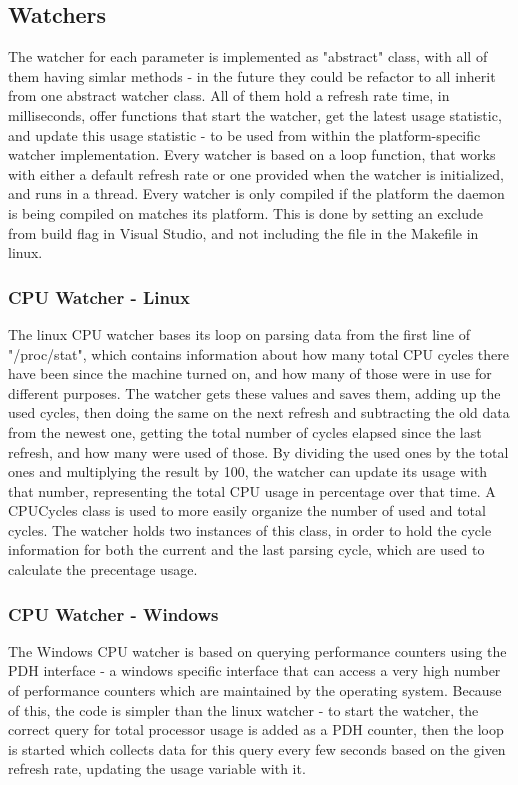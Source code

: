 \documentclass{l3proj}
\begin{document}
\subsection{Watchers}

The watcher for each parameter is implemented as "abstract" class, with all of them having simlar methods - in the future they could be refactor to all inherit from one abstract watcher class. All of them hold a refresh rate time, in milliseconds, offer functions that start the watcher, get the latest usage statistic, and update this usage statistic - to be used from within the platform-specific watcher implementation. Every watcher is based on a loop function, that works with either a default refresh rate or one provided when the watcher is initialized, and runs in a thread.
Every watcher is only compiled if the platform the daemon is being compiled on matches its platform. This is done by setting an exclude from build flag in Visual Studio, and not including the file in the Makefile in linux.

\subsubsection{CPU Watcher - Linux}

The linux CPU watcher bases its loop on parsing data from the first line of "/proc/stat", which contains information about how many total CPU cycles there have been since the machine turned on, and how many of those were in use for different purposes. The watcher gets these values and saves them, adding up the used cycles, then doing the same on the next refresh and subtracting the old data from the newest one, getting the total number of cycles elapsed since the last refresh, and how many were used of those. By dividing the used ones by the total ones and multiplying the result by 100, the watcher can update its usage with that number, representing the total CPU usage in percentage over that time.
A CPUCycles class is used to more easily organize the number of used and total cycles. The watcher holds two instances of this class, in order to hold the cycle information for both the current and the last parsing cycle, which are used to calculate the precentage usage.

\subsubsection{CPU Watcher - Windows}

The Windows CPU watcher is based on querying performance counters using the PDH interface - a windows specific interface that can access a very high number of performance counters which are maintained by the operating system. Because of this, the code is simpler than the linux watcher - to start the watcher, the correct query for total processor usage is added as a PDH counter, then the loop is started which collects data for this query every few seconds based on the given refresh rate, updating the usage variable with it.
\end{document}
